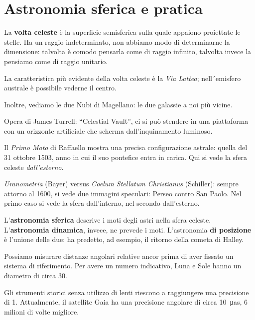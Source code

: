\documentclass[main.tex]{subfiles}
\begin{document}
\section{Astronomia sferica e pratica}


La \textbf{volta celeste} è la superficie semisferica sulla quale appaiono proiettate le stelle. Ha un raggio indeterminato, non abbiamo modo di determinarne la dimensione: talvolta è comodo pensarla come di raggio infinito, talvolta invece la pensiamo come di raggio unitario.

La caratteristica più evidente della volta celeste è la \textit{Via Lattea}; nell´emisfero australe è possibile vederne il centro. 


Inoltre, vediamo le due Nubi di Magellano: le due galassie a noi più vicine. 

Opera di James Turrell: ``Celestial Vault'', ci si può stendere in una piattaforma con un orizzonte artificiale che scherma dall'inquinamento luminoso. 

Il \textit{Primo Moto} di Raffaello mostra una precisa configurazione astrale: quella del 31 ottobre 1503, anno in cui il suo pontefice entra in carica. 
Qui si vede la sfera celeste \emph{dall'esterno}.

\emph{Uranometria} (Bayer) versus \emph{Coelum Stellatum Christianus} (Schiller): sempre attorno al 1600, si vede due immagini speculari: Perseo contro San Paolo. Nel primo caso si vede la sfera dall'interno, nel secondo dall'esterno. 

L'\textbf{astronomia sferica} descrive i moti degli astri nella sfera celeste. L'\textbf{astronomia dinamica}, invece, ne prevede i moti. 
L'astronomia \textbf{di posizione} è l'unione delle due: ha predetto, ad esempio, il ritorno della cometa di Halley. 

Possiamo misurare distanze angolari relative ancor prima di aver fissato un sistema di riferimento. 
Per avere un numero indicativo, Luna e Sole hanno un diametro di circa \SI{30}{\prime}. 

Gli strumenti storici senza utilizzo di lenti riescono a raggiungere una precisione di \SI{1}{\prime}. 
Attualmente, il satellite Gaia ha una precisione angolare di circa \SI{10}{\micro as}, 6 milioni di volte migliore. 
\end{document}
